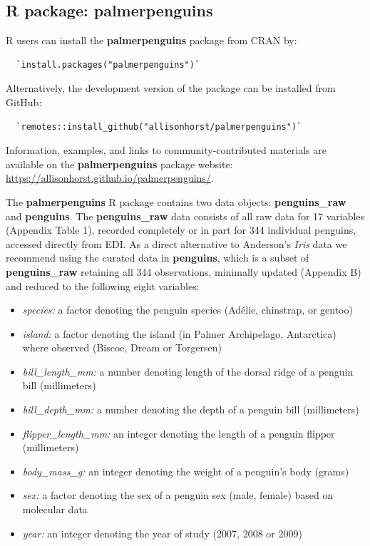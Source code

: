 \hypertarget{r-package-palmerpenguins}{%
\subsection{\texorpdfstring{R package:
\textbf{palmerpenguins}}{R package: palmerpenguins}}\label{r-package-palmerpenguins}}

R users can install the \textbf{palmerpenguins} package from CRAN by:

\begin{verbatim}
  `install.packages("palmerpenguins")`
\end{verbatim}

Alternatively, the development version of the package can be installed
from GitHub:

\begin{verbatim}
  `remotes::install_github("allisonhorst/palmerpenguins")`
\end{verbatim}

Information, examples, and links to community-contributed materials are
available on the \textbf{palmerpenguins} package website:
\url{https://allisonhorst.github.io/palmerpenguins/}.

The \textbf{palmerpenguins} R package contains two data objects:
\textbf{penguins\_raw} and \textbf{penguins}. The \textbf{penguins\_raw}
data consists of all raw data for 17 variables (Appendix Table 1),
recorded completely or in part for 344 individual penguins, accessed
directly from EDI. As a direct alternative to Anderson's \emph{Iris}
data we recommend using the curated data in \textbf{penguins}, which is
a subset of \textbf{penguins\_raw} retaining all 344 observations,
minimally updated (Appendix B) and reduced to the following eight
variables:

\begin{itemize}
\tightlist
\item
  \emph{species:} a factor denoting the penguin species (Adélie,
  chinstrap, or gentoo)
\item
  \emph{island:} a factor denoting the island (in Palmer Archipelago,
  Antarctica) where observed (Biscoe, Dream or Torgersen)
\item
  \emph{bill\_length\_mm:} a number denoting length of the dorsal ridge
  of a penguin bill (millimeters)
\item
  \emph{bill\_depth\_mm:} a number denoting the depth of a penguin bill
  (millimeters)
\item
  \emph{flipper\_length\_mm:} an integer denoting the length of a
  penguin flipper (millimeters)
\item
  \emph{body\_mass\_g:} an integer denoting the weight of a penguin's
  body (grams)
\item
  \emph{sex:} a factor denoting the sex of a penguin sex (male, female)
  based on molecular data
\item
  \emph{year:} an integer denoting the year of study (2007, 2008 or
  2009)
\end{itemize}


